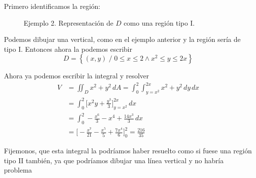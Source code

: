\documentclass[12pt]{article}
\begin{document}
Primero identificamos la región:
\begin{figure}[H]
  \centering
  {\large }
  \caption{Ejemplo 2. Representación de $ D $ como una región tipo I.}
  \label{grf:integral-doble-ej2}
\end{figure}

Podemos dibujar una vertical, como en el ejemplo anterior y la región sería de tipo I. Entonces ahora la podemos escribir
\[
  D=\left\{(x,y) \;/\; 0\leq x\leq 2 \land x^2\leq y\leq 2x\right\}
\]

Ahora ya podemos escribir la integral y resolver
\begin{align*}
  V &= \iint_{D} x^2+y^2 \,dA = \int_{0}^{2} \int_{y=x^2}^{2x} x^2+y^2 \,dy\,dx\\
   &= \int_{0}^{2} \Bigg[x^2y+\frac{y^3}{3}\Bigg]_{y=x^2}^{2x} \,dx\\
   &= \int_{0}^{2} -\frac{x^6}{3}-x^4+\frac{14x^3}{3} \,dx\\
    &= \Bigg[-\frac{x^7}{21}-\frac{x^5}{5}+\frac{7x^4}{6}\Bigg]_{0}^{2} = \frac{216}{35}
\end{align*}

Fijemonos, que esta integral la podríamos haber resuelto como si fuese una región tipo II también, ya que podríamos dibujar una línea vertical y no habría problema
\end{document}
